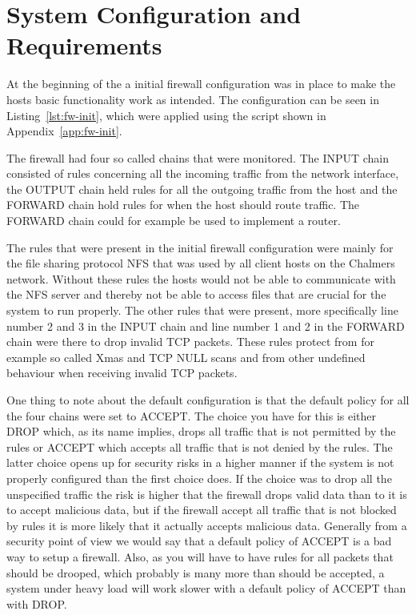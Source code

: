 \section{System Configuration and Requirements}
\label{sec:setup}

At the beginning of the \lab{} a initial firewall configuration was in place to make the hosts basic functionality work as intended. The configuration can be seen in Listing~\ref{lst:fw-init}, which were applied using the script shown in Appendix~\ref{app:fw-init}. 

The firewall had four so called chains that were monitored. The INPUT chain consisted of rules concerning all the incoming traffic from the network interface, the OUTPUT chain held rules for all the outgoing traffic from the host and the FORWARD chain hold rules for when the host should route traffic. The FORWARD chain could for example be used to implement a router.

The rules that were present in the initial firewall configuration were mainly for the file sharing protocol NFS that was used by all client hosts on the Chalmers network. Without these rules the hosts would not be able to communicate with the NFS server and thereby not be able to access files that are crucial for the system to run properly. The other rules that were present, more specifically line number 2 and 3 in the INPUT chain and line number 1 and 2 in the FORWARD chain were there to drop invalid TCP packets. These rules protect from for example so called Xmas and TCP NULL scans and from other undefined behaviour when receiving invalid TCP packets.

One thing to note about the default configuration is that the default policy for all the four chains were set to ACCEPT. The choice you have for this is either DROP which, as its name implies, drops all traffic that is not permitted by the rules or ACCEPT which accepts all traffic that is not denied by the rules. The latter choice opens up for security risks in a higher manner if the system is not properly configured than the first choice does. If the choice was to drop all the unspecified traffic the risk is higher that the firewall drops valid data than to it is to accept malicious data, but if the firewall accept all traffic that is not blocked by rules it is more likely that it actually accepts malicious data. Generally from a security point of view we would say that a default policy of ACCEPT is a bad way to setup a firewall. Also, as you will have to have rules for all packets that should be drooped, which probably is many more than should be accepted, a system under heavy load will work slower with a default policy of ACCEPT than with DROP.

\newpage
